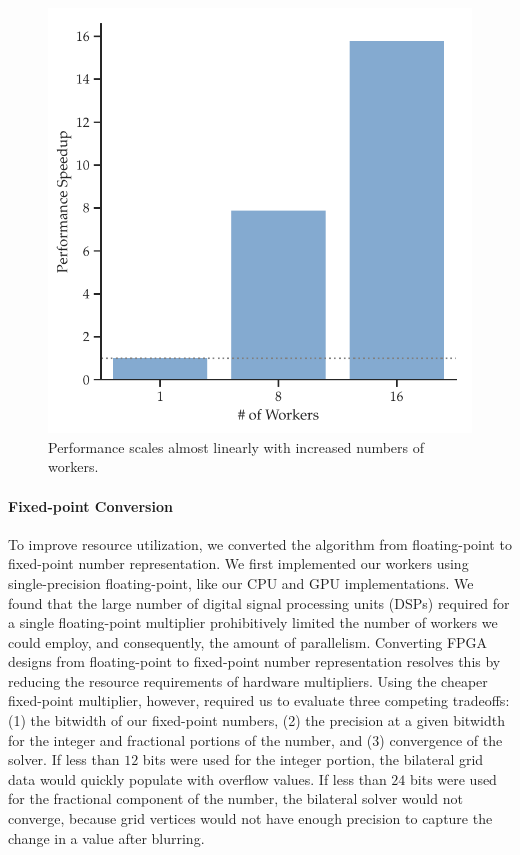 \begin{figure}[h]
\centering
\includegraphics[width=.6\columnwidth]{hfbs-figs/worker_scaling.pdf}
\caption{Performance scales almost linearly with increased numbers of workers.}
\label{fig:worker-perf}
\end{figure}



\paragraph{Fixed-point Conversion} To improve resource utilization, we converted the algorithm from floating-point to fixed-point number representation.
We first implemented our workers using single-precision floating-point, like our CPU and GPU implementations.
We found that the large number of digital signal processing units (DSPs) required for a single floating-point multiplier prohibitively limited the number of workers we could employ, and consequently, the amount of parallelism.
Converting FPGA designs from floating-point to fixed-point number representation resolves this by reducing the resource requirements of hardware multipliers.
Using the cheaper fixed-point multiplier, however, required us to evaluate three competing tradeoffs: (1) the bitwidth of our fixed-point numbers, (2) the precision at a given bitwidth for the integer and fractional portions of the number, and (3) convergence of the solver.
If less than $12$ bits were used for the integer portion, the bilateral grid data would quickly populate with overflow values.
If less than $24$ bits were used for the fractional component of the number, the bilateral solver would not converge, because grid vertices would not have enough precision to capture the change in a value after blurring.

